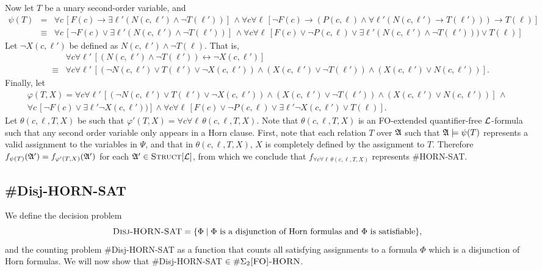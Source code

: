 Now let $T$ be a unary second-order variable, and
\begin{align*}
	\psi(T) &=& \forall c\,[ F(c) \to \exists \ell'(N(c,\ell') \wedge \neg T(\ell'))]
	\,\wedge
	 \forall c \forall \ell\, [\neg F(c)\to(P(c,\ell)\wedge\forall\ell'(N(c,\ell')\to T(\ell')))\to T(\ell)] \\
	 &\equiv& \forall c\,[ \neg F(c) \vee \exists \ell'(N(c,\ell') \wedge \neg T(\ell'))]
	 \,\wedge
	 \forall c \forall \ell\, [ F(c) \vee \neg P(c,\ell) \vee \exists\ell'(N(c,\ell') \wedge \neg T(\ell'))) \vee T(\ell)]
\end{align*}
Let $\neg X(c,\ell')$ be defined as $N(c,\ell')\wedge \neg T(\ell)$. That is,
\begin{eqnarray*}
	&& \forall c \forall \ell'\, [(N(c,\ell') \wedge \neg T(\ell')) \leftrightarrow \neg X(c,\ell')]\\
	&\equiv& \forall c \forall \ell'\,[(\neg N(c,\ell')\vee T(\ell')\vee \neg X(c,\ell'))\wedge (X(c,\ell')\vee \neg T(\ell'))\wedge (X(c,\ell')\vee N(c,\ell'))].
\end{eqnarray*}
Finally, let
\begin{multline*}
	\varphi(T,X) = \forall c \forall \ell'\,[(\neg N(c,\ell')\vee T(\ell')\vee \neg X(c,\ell'))\wedge (X(c,\ell')\vee \neg T(\ell'))\wedge (X(c,\ell')\vee N(c,\ell'))]\,\wedge \\
	\forall c\,[ \neg F(c) \vee \exists \ell'\neg X(c,\ell'))]
	\wedge
	\forall c \forall \ell\, [ F(c) \vee \neg P(c,\ell) \vee \exists\ell'\neg X(c,\ell') \vee T(\ell)].
\end{multline*}
Let $\theta(c,\ell,T,X)$ be such that $\varphi'(T,X) = \forall c \forall \ell\,\theta(c,\ell,T,X)$. Note that $\theta(c,\ell,T,X)$ is an {\sc FO}-extended quantifier-free ${\cal L}$-formula such that any second order variable only appears in a Horn clause. First, note that each relation $T$ over ${\frak A}$ such that ${\frak A}\models \psi(T)$ represents a valid assignment to the variables in $\Psi$, and that in $\theta(c,\ell,T,X)$, $X$ is completely defined by the assignment to $T$. Therefore $f_{\psi(T)}({\frak A}') = f_{\varphi'(T,X)}({\frak A}')$ for each ${\frak A}'\in\textsc{Struct}[{\cal L}]$, from which we conclude that $f_{\forall c \forall \ell\,\theta(c,\ell,T,X)}$ represents {\sc \#HORN-SAT}. 

\subsection{{\sc \#Disj-HORN-SAT}}
We define the decision problem
\[
	\textsc{Disj-HORN-SAT} = \{\Phi \mid \Phi \mbox{ is a disjunction of Horn formulas and $\Phi$ is satisfiable}\},
\]
and the counting problem {\sc \#Disj-HORN-SAT} as a function that counts all satisfying assignments to a formula $\Phi$ which is a disjunction of Horn formulas. We will now show that {\sc \#Disj-HORN-SAT} $\in\#\Sigma_2\textsc{[FO]-HORN}$.

